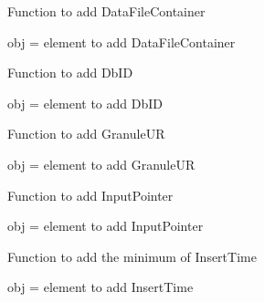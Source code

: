 \documentclass[a4paper,11pt,oneside]{sphinxmanual}
\begin{document}
\begin{fulllineitems}
\begin{fulllineitems}
\label{pymodis/pymodis:pymodis.parsemodis.parseModisMulti.valDataFiles}
Function to add DataFileContainer

obj = element to add DataFileContainer

\end{fulllineitems}


\begin{fulllineitems}
\label{pymodis/pymodis:pymodis.parsemodis.parseModisMulti.valDbID}
Function to add DbID

obj = element to add DbID

\end{fulllineitems}


\begin{fulllineitems}
\label{pymodis/pymodis:pymodis.parsemodis.parseModisMulti.valGranuleUR}
Function to add GranuleUR

obj = element to add GranuleUR

\end{fulllineitems}


\begin{fulllineitems}
\label{pymodis/pymodis:pymodis.parsemodis.parseModisMulti.valInputPointer}
Function to add InputPointer

obj = element to add InputPointer

\end{fulllineitems}


\begin{fulllineitems}
\label{pymodis/pymodis:pymodis.parsemodis.parseModisMulti.valInsTime}
Function to add the minimum of InsertTime

obj = element to add InsertTime

\end{fulllineitems}


\end{fulllineitems}
\end{document}
